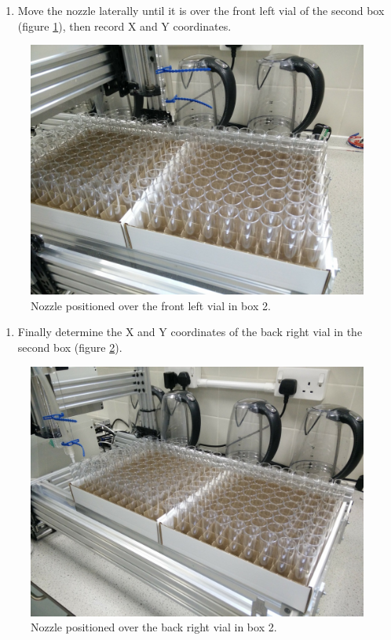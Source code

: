 \documentclass[]{book}
\providecommand{\tightlist}{%
  \setlength{\itemsep}{0pt}\setlength{\parskip}{0pt}}
\theoremstyle{definition}
\theoremstyle{definition}
\theoremstyle{definition}
\theoremstyle{remark}
\begin{document}
\begin{enumerate}
\def\labelenumi{\arabic{enumi}.}
\setcounter{enumi}{5}
\tightlist
\item
  Move the nozzle laterally until it is over the front left vial of the
  second box (figure \ref{fig:box2FrontLeft}), then record X and Y
  coordinates.
\end{enumerate}

\begin{figure}

{\centering \includegraphics[width=0.5\linewidth]{images/box2_first_vial} 

}

\caption{Nozzle positioned over the front left vial in box 2.}\label{fig:box2FrontLeft}
\end{figure}

\begin{enumerate}
\def\labelenumi{\arabic{enumi}.}
\setcounter{enumi}{6}
\tightlist
\item
  Finally determine the X and Y coordinates of the back right vial in
  the second box (figure \ref{fig:box2BackRight}).
\end{enumerate}

\begin{figure}

{\centering \includegraphics[width=0.5\linewidth]{images/box2_last_vial} 

}

\caption{Nozzle positioned over the back right vial in box 2.}\label{fig:box2BackRight}
\end{figure}
\end{document}
